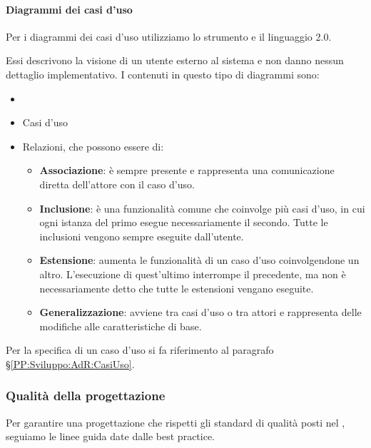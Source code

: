 		\paragraph{Diagrammi dei casi d'uso}\label{PP:Sviluppo:DiagrammiCasiUso}
		Per i diagrammi dei casi d'uso utilizziamo lo strumento  e il linguaggio  2.0.\par
		Essi descrivono la visione di un utente
		esterno al sistema e non danno nessun dettaglio implementativo. I  contenuti in questo tipo di diagrammi sono:
		\begin{itemize}
			\item {}
			\item Casi d'uso
			\item Relazioni, che possono essere di:
			\begin{itemize}
				\item \textbf{Associazione}: è sempre presente e rappresenta una comunicazione diretta dell'attore con il caso d'uso.
				\item \textbf{Inclusione}: è una funzionalità comune che coinvolge più casi d'uso, in cui ogni istanza del primo esegue
					necessariamente il secondo. Tutte le inclusioni vengono sempre eseguite dall'utente.
				\item \textbf{Estensione}: aumenta le funzionalità di un caso d'uso coinvolgendone un altro. L'esecuzione di quest'ultimo interrompe il precedente, ma non è necessariamente detto che tutte le estensioni vengano eseguite.
				\item \textbf{Generalizzazione}: avviene tra casi d'uso o tra attori e rappresenta delle modifiche alle caratteristiche di base.
			\end{itemize}
		\end{itemize}
		Per la specifica di un caso d'uso si fa riferimento al paragrafo \S\ref{PP:Sviluppo:AdR:CasiUso}.

        \newpage

		\subsubsection{Qualità della progettazione}\label{PP:Sviluppo:QualitàProgettazione}
		Per garantire una progettazione che rispetti gli standard di qualità posti nel {\PdQd}, seguiamo le linee guida date dalle best practice.

